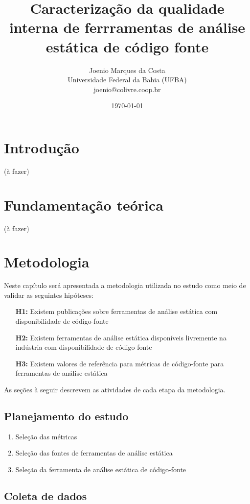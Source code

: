 \documentclass[12pt]{article}
\title{
  Caracterização da qualidade interna de ferrramentas de análise estática de
  código fonte
}
\author{Joenio Marques da Costa\\
  {\small Universidade Federal da Bahia (UFBA)} \\
  {\small joenio@colivre.coop.br}
}
\date{\today}
\begin{document}
\maketitle

\section{Introdução}

(à fazer)

\section{Fundamentação teórica}

(à fazer)

\section{Metodologia}

Neste capítulo será apresentada a metodologia utilizada no estudo como meio
de validar as seguintes hipóteses:

\begin{enumerate}
  \item[{\bf H1:}] Existem publicações sobre ferramentas de análise estática com
    disponibilidade de código-fonte
  \item[{\bf H2:}] Existem ferramentas de análise estática disponíveis livremente na
    indústria com disponibilidade de código-fonte
  \item[{\bf H3:}] Existem valores de referência para métricas de código-fonte para
    ferramentas de análise estática
\end{enumerate}

As seções à seguir descrevem as atividades de cada etapa da metodologia.

\subsection{Planejamento do estudo}

\begin{enumerate}
  \item Seleção das métricas
  \item Seleção das fontes de ferramentas de análise estática
  \item Seleção da ferramenta de análise estática de código-fonte
\end{enumerate}

\subsection{Coleta de dados}
\end{document}

